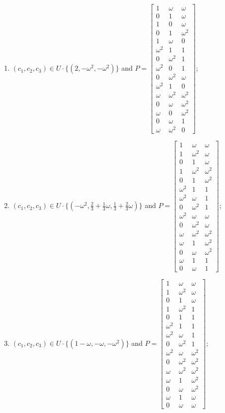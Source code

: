 \begin{enumerate}
\item[(f83)\,\newitem] $(c_1,c_2,c_3)\in U\cdot\{(2,-\omega^2,-\omega^2)\}$ and $P=\begin{bmatrix}1&\omega&\omega\\0&1&\omega\\1&0&\omega\\0&1&\omega^2\\1&\omega&0\\\omega^2&1&1\\0&\omega^2&1\\\omega^2&0&1\\0&\omega^2&\omega\\\omega^2&1&0\\\omega&\omega^2&\omega^2\\0&\omega&\omega^2\\\omega&0&\omega^2\\0&\omega&1\\\omega&\omega^2&0\end{bmatrix}$;
\item[(f84)\,\newitem] $(c_1,c_2,c_3)\in U\cdot\{(-\omega^2,\tfrac{2}{3}+\tfrac{1}{3}\omega,\tfrac{1}{3}+\tfrac{2}{3}\omega)\}$ and $P=\begin{bmatrix}1&\omega&\omega\\1&\omega^2&\omega\\0&1&\omega\\1&\omega^2&\omega^2\\0&1&\omega^2\\\omega^2&1&1\\\omega^2&\omega&1\\0&\omega^2&1\\\omega^2&\omega&\omega\\0&\omega^2&\omega\\\omega&\omega^2&\omega^2\\\omega&1&\omega^2\\0&\omega&\omega^2\\\omega&1&1\\0&\omega&1\end{bmatrix}$;
\item[(f85)\,\newitem] $(c_1,c_2,c_3)\in U\cdot\{(1-\omega,-\omega,-\omega^2)\}$ and $P=\begin{bmatrix}1&\omega&\omega\\1&\omega^2&\omega\\0&1&\omega\\1&\omega^2&1\\0&1&1\\\omega^2&1&1\\\omega^2&\omega&1\\0&\omega^2&1\\\omega^2&\omega&\omega^2\\0&\omega^2&\omega^2\\\omega&\omega^2&\omega^2\\\omega&1&\omega^2\\0&\omega&\omega^2\\\omega&1&\omega\\0&\omega&\omega\end{bmatrix}$;

\end{enumerate}
